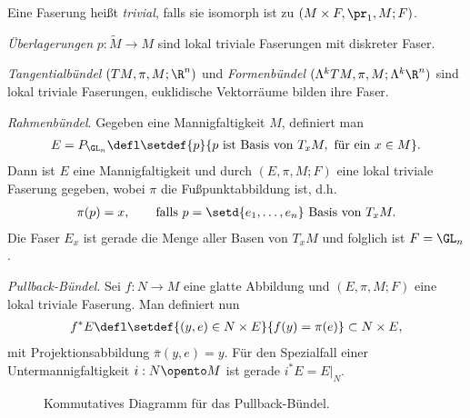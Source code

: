 \documentclass[%
	paper=a5,%
	fleqn,%
	DIV=18,%
	BCOR=0mm,
	fontsize=11pt,
	titlepage=false,%
	bibliography=totoc,
	DIV=18,%
	twoside=true,
	pdftitle=Riemannsche Geometrie,
	pdfauthor=Uwe Semmelmann,
	numbers=noendperiod]%
	{scrbook}
\begin{document}
\begin{rem}
Eine Faserung heißt \emph{trivial}, falls sie isomorph ist zu $(M\times
F,\pr_1,M;F)$.
\end{rem}

\begin{ex}
\begin{exenum}
\item \textit{Überlagerungen} $p: \tilde{M}\to M$ sind lokal triviale
Faserungen mit diskreter Faser.
\item \textit{Tangentialbündel} $(TM,\pi,M;\R^n)$ und
\textit{Formenbündel} $(\Lambda^k TM,\pi,M;\Lambda^k\R^n)$ sind lokal triviale
Faserungen, euklidische Vektorräume bilden ihre Faser.
\item {}\textit{Rahmenbündel}. Gegeben eine Mannigfaltigkeit
$M$, definiert man
\begin{align*}
E = P_{\GL_n} \defl
\setdef{p}{p\text{ ist Basis von }T_xM,\text{ für ein }x\in M}.
\end{align*}
Dann ist $E$ eine Mannigfaltigkeit und durch $(E,\pi,M;F)$ eine lokal triviale
Faserung gegeben, wobei $\pi$ die Fußpunktabbildung ist, d.h.
\begin{align*}
\pi(p) = x,\qquad \text{falls } p = \setd{e_1,\ldots,e_n} \text{ Basis von
}T_xM.
\end{align*}
Die Faser $E_x$ ist gerade die Menge aller Basen von $T_xM$ und folglich ist $F
= \GL_n$.
\item {}\textit{Pullback-Bündel}. Sei $f: N\to M$ eine
glatte Abbildung und $(E,\pi,M;F)$ eine lokal triviale Faserung. Man definiert nun
\begin{align*}
f^*E \defl \setdef{(y,e)\in N\times E}{f(y) = \pi(e)} \subset N\times E, 
\end{align*}
mit Projektionsabbildung $\bar{\pi}(y,e) = y$.
Für den Spezialfall einer Untermannigfaltigkeit $i: N\opento M$ ist gerade $i^*E
= E\big|_N$.\bsp
\end{exenum}
\end{ex}


\begin{figure}[H]
\centering
{}
\caption{Kommutatives Diagramm für das Pullback-Bündel.}
\end{figure}
\end{document}
